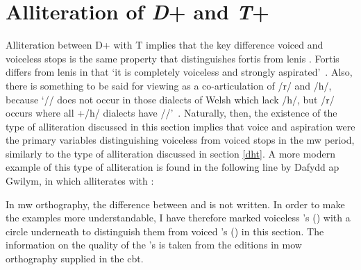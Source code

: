 \section{Alliteration of \textit{D}+ and \textit{T}+}
\label{drhtr}
Alliteration between \gls{D}+ with \gls{T} implies that the key difference voiced and voiceless stops is the same property that distinguishes fortis  from lenis . Fortis  differs from lenis  in that `it is completely voiceless and strongly aspirated'~\autocite[50]{jones_distinctive_1984}. Also, there is something to be said for viewing  as a co-articulation of /r/ and /h/, because `/\rh/ does not occur in those dialects of Welsh which lack /h/, but /r/ occurs where all +/h/ dialects have /\rh/'~\autocite[50]{jones_distinctive_1984}. Naturally, then, the existence of the type of alliteration discussed in this section implies that voice and aspiration were the primary variables distinguishing voiceless from voiced stops in the \gls{mw} period, similarly to the type of alliteration discussed in section \ref{dht}. A more modern example of this type of alliteration is found in the following line by Dafydd ap Gwilym, in which  alliterates with :  

In \gls{mw} orthography, the difference between  and  is not written. In order to make the examples more understandable, I have therefore marked voiceless \mw{\rh}'s () with a circle underneath to distinguish them from voiced 's () in this section. The information on the quality of the 's is taken from the editions in \gls{mow} orthography supplied in the \gls{cbt}.
